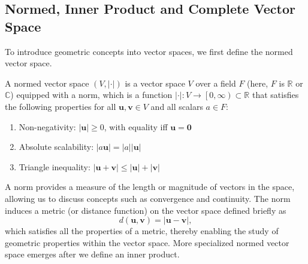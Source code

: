 \subsection{Normed, Inner Product and Complete Vector Space}\label{sec:normed_inner_product_complete_vector_space}
To introduce geometric concepts into vector spaces, we first define the normed vector space.
\begin{definition}
A normed vector space $(V,\lvert\cdot\rvert)$ is a vector space $V$ over a field $F$ (here, $F$ is $\mathbb{R}$ or $\mathbb{C}$) equipped with a norm, which is a function $\lvert\cdot\rvert:V\to\left[0,\infty\right)\subset\mathbb{R}$ that satisfies the following properties for all $\symbf{u},\symbf{v}\in V$ and all scalars $a\in F$:
\begin{enumerate}\def\labelenumi{\arabic{enumi}.}
\item Non-negativity: $\lvert\symbf{u}\rvert\geq 0$, with equality iff $\symbf{u}=\symbf{0}$
\item Absolute scalability: $\lvert a\symbf{u}\rvert=\lvert a\rvert\lvert\symbf{u}\rvert$
\item Triangle inequality: $\lvert\symbf{u}+\symbf{v}\rvert\leq\lvert\symbf{u}\rvert+\lvert\symbf{v}\rvert$
\end{enumerate}
\end{definition}
A norm provides a measure of the length or magnitude of vectors in the space, allowing us to discuss concepts such as convergence and continuity. The norm induces a metric (or distance function) on the vector space defined briefly as
\begin{equation}
d(\symbf{u},\symbf{v})=\lvert\symbf{u}-\symbf{v}\rvert,
\end{equation}
which satisfies all the properties of a metric, thereby enabling the study of geometric properties within the vector space. More specialized normed vector space emerges after we define an inner product.

